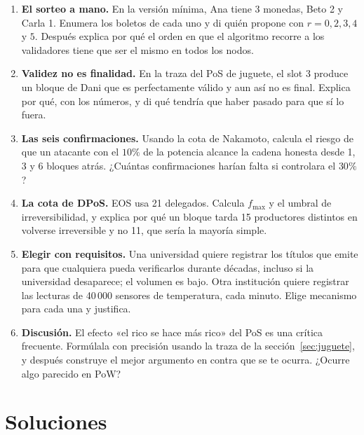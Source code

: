 \documentclass[11pt,a4paper]{article}
\theoremstyle{definition}
\theoremstyle{plain}
\theoremstyle{remark}
\begin{document}
\begin{enumerate}[leftmargin=1.8em,itemsep=0.8em]

\item\label{ej:sorteo} \textbf{El sorteo a mano.}
En la versión mínima, Ana tiene 3 monedas, Beto 2 y Carla 1. Enumera los boletos
de cada uno y di quién propone con $r = 0, 2, 3, 4$ y $5$. Después explica por
qué el orden en que el algoritmo recorre a los validadores tiene que ser el mismo
en todos los nodos.

\item\label{ej:finalidad} \textbf{Validez no es finalidad.}
En la traza del PoS de juguete, el slot 3 produce un bloque de Dani que es
perfectamente válido y aun así no es final. Explica por qué, con los números, y
di qué tendría que haber pasado para que sí lo fuera.

\item\label{ej:confirmaciones} \textbf{Las seis confirmaciones.}
Usando la cota de Nakamoto, calcula el riesgo de que un atacante con el $10\%$ de
la potencia alcance la cadena honesta desde 1, 3 y 6 bloques atrás. ¿Cuántas
confirmaciones harían falta si controlara el $30\%$?

\item\label{ej:dpos} \textbf{La cota de DPoS.}
EOS usa 21 delegados. Calcula $f_{\max}$ y el umbral de irreversibilidad, y
explica por qué un bloque tarda 15 productores distintos en volverse
irreversible y no 11, que sería la mayoría simple.

\item\label{ej:elegir} \textbf{Elegir con requisitos.}
Una universidad quiere registrar los títulos que emite para que cualquiera pueda
verificarlos durante décadas, incluso si la universidad desaparece; el volumen es
bajo. Otra institución quiere registrar las lecturas de 40\,000 sensores de
temperatura, cada minuto. Elige mecanismo para cada una y justifica.

\item\label{ej:rico} \textbf{Discusión.}
El efecto «el rico se hace más rico» del PoS es una crítica frecuente. Formúlala
con precisión usando la traza de la sección~\ref{sec:juguete}, y después
construye el mejor argumento en contra que se te ocurra. ¿Ocurre algo parecido en
PoW?

\end{enumerate}

\appendix
\section{Soluciones}\label{app:soluciones}
\end{document}
